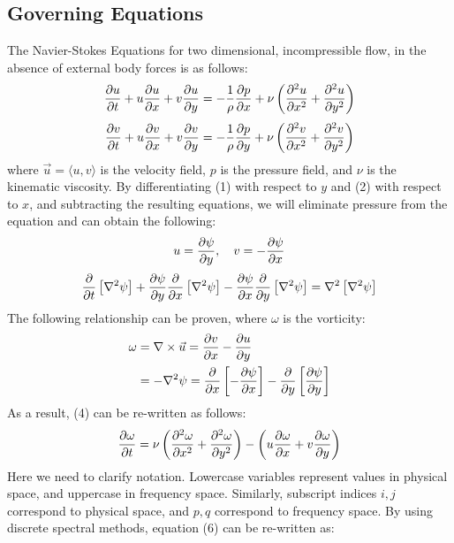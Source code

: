 \documentclass[10pt, reqno]{amsart}
\begin{document}
\begin{multicols}{2}
\section*{Governing Equations}
The Navier-Stokes Equations for two dimensional, incompressible flow, in the absence of external body forces is as follows:
\begin{equation}
    \pdv{u}{t} + u \pdv{u}{x} + v \pdv{u}{y} = -\frac{1}{\rho} \pdv{p}{x} + \nu \left( \pdv[2]{u}{x} + \pdv[2]{u}{y} \right)
\end{equation}
\begin{equation}
    \pdv{v}{t} + u \pdv{v}{x} + v \pdv{v}{y} = -\frac{1}{\rho} \pdv{p}{y} + \nu \left( \pdv[2]{v}{x} + \pdv[2]{v}{y} \right)
\end{equation}
where $\vec{u} = \langle u, v \rangle$ is the velocity field, $p$ is the pressure field, and $\nu$ is the kinematic viscosity. By differentiating (1) with respect to $y$ and (2) with respect to $x$, and subtracting the resulting equations, we will eliminate pressure from the equation and can obtain the following:
\begin{equation}
    u = \pdv{\psi}{y}, \quad v = - \pdv{\psi}{x}
\end{equation}
\begin{equation}
    \pdv{}{t} \left[ \nabla^2 \psi \right] + \pdv{\psi}{y} \pdv{}{x} \left[ \nabla^2 \psi \right] - \pdv{\psi}{x} \pdv{}{y} \left[ \nabla^2 \psi \right] = \nabla^2 \left[ \nabla^2 \psi \right]
\end{equation}
The following relationship can be proven, where $\omega$ is the vorticity:
\begin{equation}
    \begin{aligned}
    \omega &= \nabla \times \vec{u} = \pdv{v}{x} - \pdv{u}{y} \\
    &= - \nabla^2 \psi = \pdv{}{x} \left[ - \pdv{\psi}{x} \right] - \pdv{}{y} \left[ \pdv{\psi}{y} \right]
    \end{aligned}
\end{equation}
As a result, (4) can be re-written as follows:
\begin{equation}
    \pdv{\omega}{t} = \nu \left( \pdv[2]{\omega}{x} + \pdv[2]{\omega}{y} \right) - \left(u \pdv{\omega}{x} + v \pdv{\omega}{y} \right)
\end{equation}
Here we need to clarify notation. Lowercase variables represent values in physical space, and uppercase in frequency space. Similarly, subscript indices $i, j$ correspond to physical space, and $p, q$ correspond to frequency space. By using discrete spectral methods, equation (6) can be re-written as:

\end{multicols}
\end{document}
